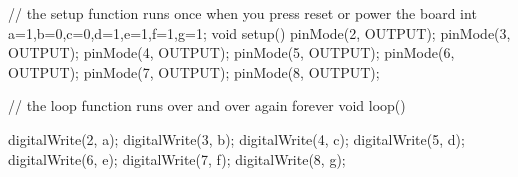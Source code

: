 // the setup function runs once when you press reset or power the board
int a=1,b=0,c=0,d=1,e=1,f=1,g=1;
void setup() {
    pinMode(2, OUTPUT);  
    pinMode(3, OUTPUT);
    pinMode(4, OUTPUT);
    pinMode(5, OUTPUT);
    pinMode(6, OUTPUT);
    pinMode(7, OUTPUT);
    pinMode(8, OUTPUT);            
}

// the loop function runs over and over again forever
void loop() {
  
  digitalWrite(2, a); 
  digitalWrite(3, b); 
  digitalWrite(4, c); 
  digitalWrite(5, d); 
  digitalWrite(6, e); 
  digitalWrite(7, f);     
  digitalWrite(8, g); 
}

